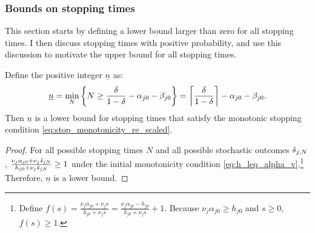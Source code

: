 \subsubsection*{Bounds on stopping times}

This section starts by defining a lower bound larger than zero for all stopping times.
I then discuss stopping times with positive probability, and use this discussion to motivate the upper bound for all stopping times.

\begin{lemma}
Define the positive integer $\underline{n}$ as:
\begin{align}\label{eq:lower_n}
     \underline{n} = \min_N \left\{ 
     N \geq
        \frac{\delta}{1 - \delta}
    - \alpha_{j0} - \beta_{j0}
     \right\}
     =
     \ceil{\frac{\delta}{1 - \delta}} - \alpha_{j0} - \beta_{j0}.
 \end{align}
Then $\underline{n}$ is a lower bound for stopping times that satisfy the monotonic stopping condition \eqref{eq:stop_monotonicity_re_scaled}.
\end{lemma}
\begin{proof}
For all possible stopping times $N$ and all possible stochastic outcomes $\ks[,N]$, $\frac{\nu_j \alpha_{j0} + \nu_j \ks[N]}{h_{j0} + \nu_j \ks[N]} \geq 1$ under the initial monotonicity condition \eqref{eq:h_leq_alpha_v}.\footnote{
    Define $f(s) = \frac{\nu_j \alpha_{j0} + \nu_j s}{h_{j0} + \nu_j s} = \frac{\nu_j \alpha_{j0} - h_{j0}}{h_{j0} + \nu_j s} + 1$.
    Because $\nu_j \alpha_{j0} \geq h_{j0}$ and $s \geq 0$, $f(s) \geq 1$.
}
Therefore, $\underline{n}$ is a lower bound.
\end{proof}





